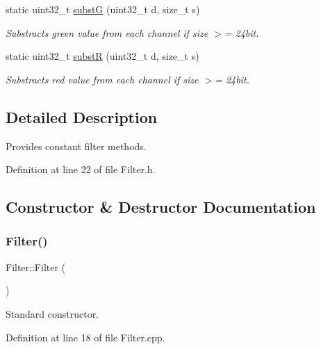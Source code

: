 \begin{DoxyCompactItemize}
static uint32\+\_\+t \mbox{\hyperlink{classFilter_afc6fee2bd138d157986ef3e2f2907186}{substG}} (uint32\+\_\+t d, size\+\_\+t s)
\begin{DoxyCompactList}\small\item\em Substracts green value from each channel if size $>$= 24bit. \end{DoxyCompactList}\item 
static uint32\+\_\+t \mbox{\hyperlink{classFilter_a773ee633720080079d6a17ac610d353d}{substR}} (uint32\+\_\+t d, size\+\_\+t s)
\begin{DoxyCompactList}\small\item\em Substracts red value from each channel if size $>$= 24bit. \end{DoxyCompactList}\end{DoxyCompactItemize}


\subsection{Detailed Description}
Provides constant filter methods. 

Definition at line 22 of file Filter.\+h.



\subsection{Constructor \& Destructor Documentation}
\mbox{\label{classFilter_ad15994c30d497afd567a6445446a249e}} 
\subsubsection{\texorpdfstring{Filter()}{Filter()}\hspace{0.1cm}{\footnotesize\ttfamily [1/2]}}
{\footnotesize\ttfamily Filter\+::\+Filter (\begin{DoxyParamCaption}{ }\end{DoxyParamCaption})}



Standard constructor. 



Definition at line 18 of file Filter.\+cpp.

\mbox{\label{classFilter_a6ed476659596aa4bc61e69514960d95b}} 
